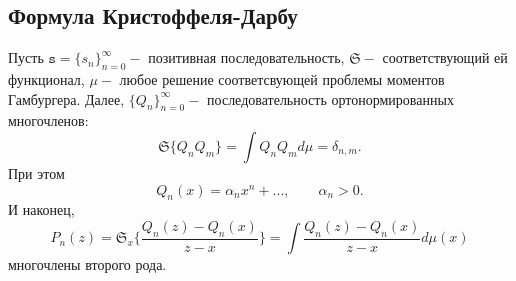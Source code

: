 \documentclass[12pt,a4paper]{article}
\theoremstyle{plain}   \newtheorem{Pro}{Задача}
\begin{document}
\subsection{Формула Кристоффеля-Дарбу}
$ \; $
\\
Пусть
$ \mathtt{s}=\{ s_n \} _{n=0}^{\infty} - $
позитивная последовательность,
$ \mathfrak{S} - $
соответствующий ей функционал,
$ \mu - $
любое решение соответсвующей проблемы моментов Гамбургера.
Далее,
$ \{ Q_n \} _{n=0}^{\infty} - $
последовательность ортонормированных многочленов:
$$
  \mathfrak{S} \{ Q_n Q_m \} = \int Q_n Q_m d\mu =
  \delta _{n,m}.
$$
При этом
$$
  Q_n (x) = \alpha _n x^n +...,
  \qquad \alpha _n >0.
$$
И наконец,
$$
  P_n (z)=\mathfrak{S}_x  \Biggl \{
  \frac{Q_n (z)-Q_n (x)}{z-x} \Biggr \} =
  \int \frac{Q_n (z)-Q_n (x) }{z-x}d\mu (x)
$$
многочлены второго рода.
\\
\end{document}
